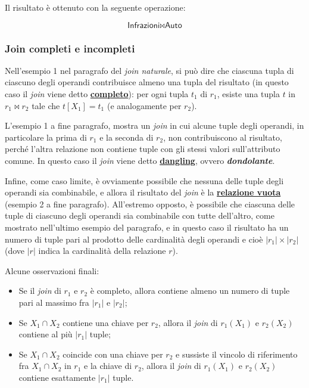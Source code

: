 \documentclass[a4paper]{article}
\begin{document}
	\noindent
	Il risultato è ottenuto con la seguente operazione:
	
	\begin{equation*}
		\textsf{Infrazioni} \Join \textsf{Auto}
	\end{equation*}

	\newpage
	
	\subsubsection{Join completi e incompleti}
	
	Nell'esempio 1 nel paragrafo del \emph{join naturale}, si può dire che ciascuna tupla di ciascuno degli operandi contribuisce almeno una tupla del risultato (in questo caso il \emph{join} viene detto \textcolor{Red3}{\textbf{\underline{completo}}}): per ogni tupla $t_{1}$ di $r_{1}$, esiste una tupla $t$ in $r_{1} \Join r_{2}$ tale che $t\left[X_{1}\right] = t_{1}$ (e analogamente per $r_{2}$).
	
	L'esempio 1 a fine paragrafo, mostra un \emph{join} in cui alcune tuple degli operandi, in particolare la prima di $r_{1}$ e la seconda di $r_{2}$, non contribuiscono al risultato, perché l'altra relazione non contiene tuple con gli stessi valori sull'attributo comune. In questo caso il \emph{join} viene detto \textcolor{Red3}{\textbf{\underline{dangling}}}, ovvero \textbf{\emph{dondolante}}.
	
	Infine, come caso limite, è ovviamente possibile che nessuna delle tuple degli operandi sia combinabile, e allora il risultato del \emph{join} è la \textcolor{Red3}{\textbf{\underline{relazione vuota}}} (esempio 2 a fine paragrafo). All'estremo opposto, è possibile che ciascuna delle tuple di ciascuno degli operandi sia combinabile con tutte dell'altro, come mostrato nell'ultimo esempio del paragrafo, e in questo caso il risultato ha un numero di tuple pari al prodotto delle cardinalità degli operandi e cioè $|r_{1}| \times |r_{2}|$ (dove $|r|$ indica la cardinalità della relazione $r$).\newline
	
	\noindent
	Alcune osservazioni finali:
	\begin{itemize}
		\item Se il \emph{join} di $r_{1}$ e $r_{2}$ è completo, allora contiene almeno un numero di tuple pari al massimo fra $|r_{1}|$ e $|r_{2}|$;
		
		\item Se $X_{1} \cap X_{2}$ contiene una chiave per $r_{2}$, allora il \emph{join} di $r_{1}\left(X_{1}\right)$ e $r_{2}\left(X_{2}\right)$ contiene al più $|r_{1}|$ tuple;
		
		\item Se $X_{1} \cap X_{2}$ coincide con una chiave per $r_{2}$ e sussiste il vincolo di riferimento fra $X_{1} \cap X_{2}$ in $r_{1}$ e la chiave di $r_{2}$, allora il \emph{join} di $r_{1}\left(X_{1}\right)$ e $r_{2}\left(X_{2}\right)$ contiene esattamente $|r_{1}|$ tuple.
	\end{itemize}\newpage
\end{document}
